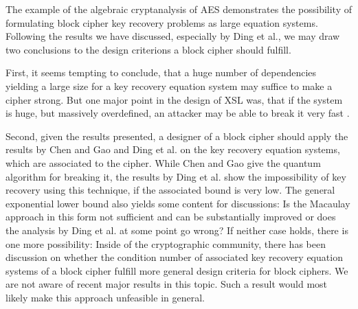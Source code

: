 \begin{remark}
    The example of the algebraic cryptanalysis of AES demonstrates the possibility of formulating block cipher key recovery problems as large equation systems. Following the results we have discussed, especially by Ding et al., we may draw two conclusions to the design criterions a block cipher should fulfill.
    
    First, it seems tempting to conclude, that a huge number of dependencies yielding a large size for a key recovery equation system may suffice to make a cipher strong. But one major point in the design of XSL was, that if the system is huge, but massively overdefined, an attacker may be able to break it very fast \cite[p. 15]{Courtois2002}.

    Second, given the results presented, a designer of a block cipher should apply the results by Chen and Gao and Ding et al. on the key recovery equation systems, which are associated to the cipher. While Chen and Gao give the quantum algorithm for breaking it, the results by Ding et al. show the impossibility of key recovery using this technique, if the associated bound is very low. The general exponential lower bound also yields some content for discussions: Is the Macaulay approach in this form not sufficient and can be substantially improved or does the analysis by Ding et al. at some point go wrong? If neither case holds, there is one more possibility: Inside of the cryptographic community, there has been discussion on whether the condition number of associated key recovery equation systems of a block cipher fulfill more general design criteria for block ciphers. We are not aware of recent major results in this topic. Such a result would most likely make this approach unfeasible in general.
\end{remark}
